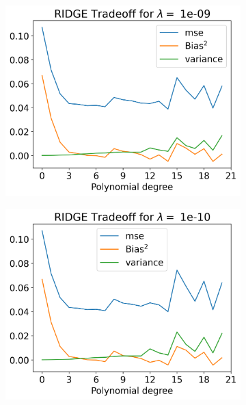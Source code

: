 \documentclass[12pt]{article}
\begin{document}
\begin{figure}[H]
\begin{subfigure}{.5\textwidth}
    \centering
    \includegraphics[width=\textwidth]{../figures/tradeoff_RIDGE_1e-09_20.png}
    \caption{}
    \label{fig:l_1e-09}
  \end{subfigure}
  \begin{subfigure}{.5\textwidth}
    \centering
    \includegraphics[width=\textwidth]{../figures/tradeoff_RIDGE_1e-10_20.png}
    \caption{}
    \label{fig:l_1e-10}
  \end{subfigure}
  \begin{subfigure}{.5\textwidth}
    \centering

\end{subfigure}
\end{figure}
\end{document}
